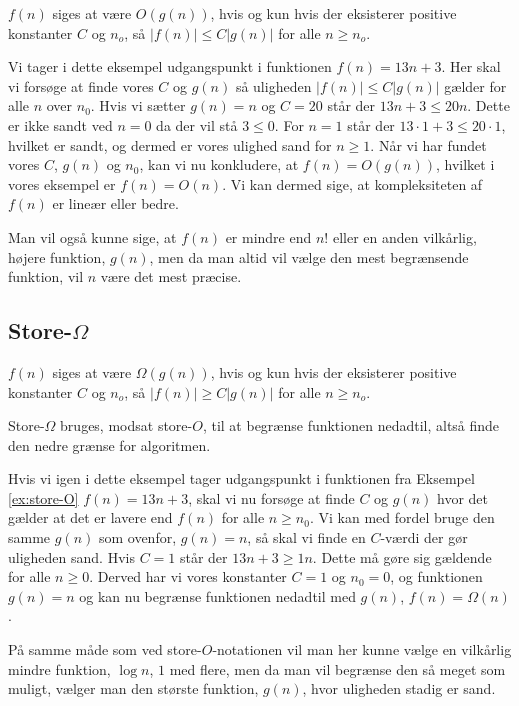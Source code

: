 \begin{defn}
$f(n)$ siges at være $O(g(n))$, hvis og kun hvis der eksisterer positive konstanter $C$ og $n_o$, så $|f(n)| \leq C |g(n)|$ for alle $n \geq n_o$.
\end{defn}


\begin{exmp} \label{ex:store-O}
Vi tager i dette eksempel udgangspunkt i funktionen $f(n)=13n+3$. 
Her skal vi forsøge at finde vores $C$ og $g(n)$ så uligheden $|f(n)| \leq C|g(n)|$ gælder for alle $n$ over $n_0$. Hvis vi sætter $g(n) = n$ og $C=20$ står der $13n+3 \leq 20n$. Dette er ikke sandt ved $n=0$ da der vil stå $3 \leq 0$. For $n=1$ står der $13\cdot 1 + 3 \leq 20 \cdot 1$, hvilket er sandt, og dermed er vores ulighed sand for $n \geq 1$.
Når vi har fundet vores $C$, $g(n)$ og $n_0$, kan vi nu konkludere, at $f(n) = O(g(n))$, hvilket i vores eksempel er $f(n) = O(n)$.
Vi kan dermed sige, at kompleksiteten af $f(n)$ er lineær eller bedre.
\end{exmp}
Man vil også kunne sige, at $f(n)$ er mindre end $n!$ eller en anden vilkårlig, højere funktion, $g(n)$, men da man altid vil vælge den mest begrænsende funktion, vil $n$ være det mest præcise. 

\subsection{Store-$\Omega$}
\begin{defn}
$f(n)$ siges at være  $\Omega(g(n))$, hvis og kun hvis der eksisterer positive konstanter $C$ og $n_o$, så $|f(n)| \geq C |g(n)|$ for alle $n \geq n_o$.
\end{defn}
Store-$\Omega$ bruges, modsat store-$O$, til at begrænse funktionen nedadtil, altså finde den nedre grænse for algoritmen.
\begin{exmp}
Hvis vi igen i dette eksempel tager udgangspunkt i funktionen fra Eksempel \ref{ex:store-O} $f(n)=13n+3$, skal vi nu forsøge at finde $C$ og $g(n)$ hvor det gælder at det er lavere end $f(n)$ for alle $n \geq n_0$. 
Vi kan med fordel bruge den samme $g(n)$ som ovenfor, $g(n)=n$, så skal vi finde en $C$-værdi der gør uligheden sand. Hvis $C=1$ står der $13n+3 \geq 1n$. Dette må gøre sig gældende for alle $n \geq 0$. Derved har vi vores konstanter $C=1$ og $n_0 = 0$, og funktionen $g(n)=n$ og kan nu begrænse funktionen nedadtil med $g(n)$, $f(n)=\Omega(n)$.
\end{exmp}

På samme måde som ved store-$O$-notationen vil man her kunne vælge en vilkårlig mindre funktion, $\log n$, $1$ med flere, men da man vil begrænse den så meget som muligt, vælger man den største funktion, $g(n)$, hvor uligheden stadig er sand.
